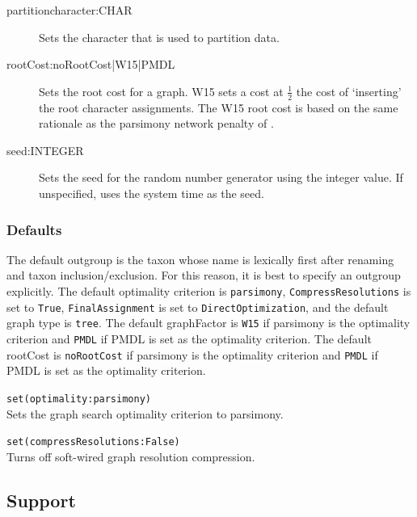 \begin{description}
			\item[partitioncharacter:CHAR] Sets the character that is used to partition data. %
			
			\item[rootCost:noRootCost|W15|PMDL] Sets the root cost for a graph. W15 sets a 
			cost at $\frac{1}{2}$ the cost of `inserting' the root character assignments. 
			The W15 root cost is based on the same rationale as the parsimony network penalty of
			 \cite{Wheeler2015}.
			 
			 \item[seed:INTEGER] Sets the seed for the random number generator using the integer
			 value. If unspecified, \phyg uses the system time as the seed.
		\end{description}
					
	\subsubsection{Defaults} 
		The default outgroup is the taxon whose name is 
		lexically first after renaming and taxon inclusion/exclusion. For this reason, it is best to specify 
		an outgroup explicitly. The default optimality criterion is \texttt{parsimony}, \texttt{CompressResolutions} 
		is set to \texttt{True}, \texttt{FinalAssignment} is set to \texttt{DirectOptimization}, and the default 
		graph type is \texttt{tree}. The default graphFactor is \texttt{W15} if parsimony is the optimality 
		criterion and \texttt{PMDL} if PMDL is set as the optimality criterion. The default rootCost
		is \texttt{noRootCost} if parsimony is the optimality criterion and \texttt{PMDL} if PMDL is set 
		as the optimality criterion.
		
	\begin{example}
		\item{\texttt{set(optimality:parsimony)}\\Sets the graph search optimality criterion to parsimony.}
						
		\item{\texttt{set(compressResolutions:False)}\\Turns off soft-wired graph resolution compression.}
	\end{example}

\subsection{Support}
